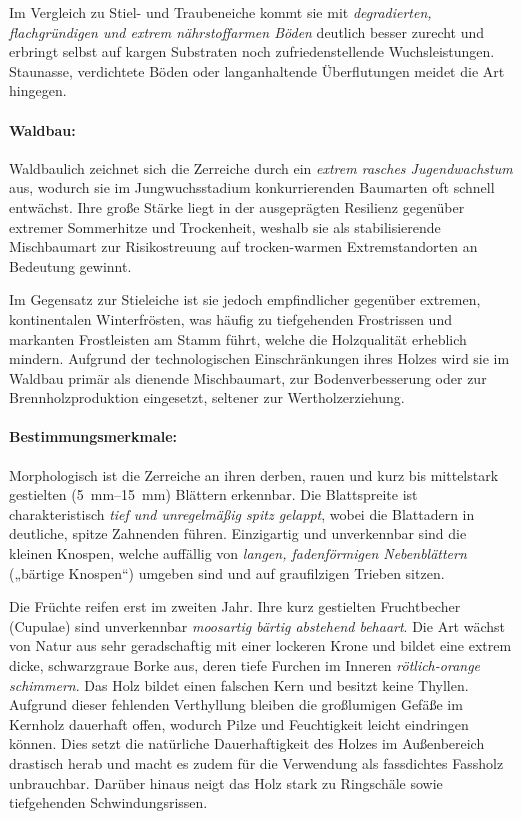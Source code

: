 \documentclass[twocolumn, bibliography=totoc, abstract=true]{scrartcl}
\begin{document}
Im Vergleich zu Stiel- und Traubeneiche kommt sie mit \emph{degradierten, flachgründigen und extrem nährstoffarmen Böden} deutlich besser zurecht und erbringt selbst auf kargen Substraten noch zufriedenstellende Wuchsleistungen. Staunasse, verdichtete Böden oder langanhaltende Überflutungen meidet die Art hingegen.

\paragraph{Waldbau:} 
Waldbaulich zeichnet sich die Zerreiche durch ein \emph{extrem rasches Jugendwachstum} aus, wodurch sie im Jungwuchsstadium konkurrierenden Baumarten oft schnell entwächst. Ihre große Stärke liegt in der ausgeprägten Resilienz gegenüber extremer Sommerhitze und Trockenheit, weshalb sie als stabilisierende Mischbaumart zur Risikostreuung auf trocken-warmen Extremstandorten an Bedeutung gewinnt. 

Im Gegensatz zur Stieleiche ist sie jedoch empfindlicher gegenüber extremen, kontinentalen Winterfrösten, was häufig zu tiefgehenden Frostrissen und markanten Frostleisten am Stamm führt, welche die Holzqualität erheblich mindern. Aufgrund der technologischen Einschränkungen ihres Holzes wird sie im Waldbau primär als dienende Mischbaumart, zur Bodenverbesserung oder zur Brennholzproduktion eingesetzt, seltener zur Wertholzerziehung.

\paragraph{Bestimmungsmerkmale:} 
Morphologisch ist die Zerreiche an ihren derben, rauen und kurz bis mittelstark gestielten (\qtyrange{5}{15}{\mm}) Blättern erkennbar. Die Blattspreite ist charakteristisch \emph{tief und unregelmäßig spitz gelappt}, wobei die Blattadern in deutliche, spitze Zahnenden führen. Einzigartig und unverkennbar sind die kleinen Knospen, welche auffällig von \emph{langen, fadenförmigen Nebenblättern} („bärtige Knospen“) umgeben sind und auf graufilzigen Trieben sitzen. 

Die Früchte reifen erst im zweiten Jahr. Ihre kurz gestielten Fruchtbecher (Cupulae) sind unverkennbar \emph{moosartig bärtig abstehend behaart}. Die Art wächst von Natur aus sehr geradschaftig mit einer lockeren Krone und bildet eine extrem dicke, schwarzgraue Borke aus, deren tiefe Furchen im Inneren \emph{rötlich-orange schimmern}. Das Holz bildet einen falschen Kern und besitzt keine Thyllen. Aufgrund dieser fehlenden Verthyllung bleiben die großlumigen Gefäße im Kernholz dauerhaft offen, wodurch Pilze und Feuchtigkeit leicht eindringen können. Dies setzt die natürliche Dauerhaftigkeit des Holzes im Außenbereich drastisch herab und macht es zudem für die Verwendung als fassdichtes Fassholz unbrauchbar. Darüber hinaus neigt das Holz stark zu Ringschäle sowie tiefgehenden Schwindungsrissen.
\end{document}
